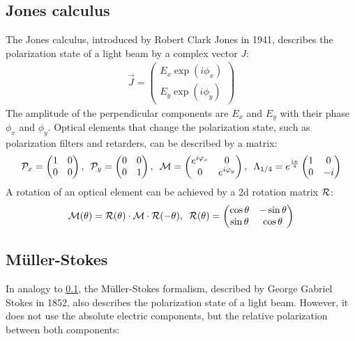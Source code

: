 \subsection{Jones calculus}
\label{sec:jones}
% 
The Jones calculus, introduced by Robert Clark Jones in 1941, describes the polarization state of a light beam by a complex vector $J$:
% 
\begin{align}
    \vec{J} = \begin{pmatrix} E_x \exp(i \phi_x) \\ E_y \exp(i \phi_y) \end{pmatrix}
\end{align}
% 
The amplitude of the perpendicular components are $E_x$ and $E_y$ with their phase $\phi_x$ and $\phi_y$.
Optical elements that change the polarization state, such as polarization filters and retarders, can be described by a matrix:
% 
\begin{align}
\begin{split}
\mathcal{P}_x = 
\begin{pmatrix}
1 & 0 \\ 0 & 0
\end{pmatrix}
, \enspace
\mathcal{P}_y = 
\begin{pmatrix}
0 & 0 \\ 0 & 1
\end{pmatrix}
, \enspace
\mathcal{M} =
\begin{pmatrix}
e^{i \varphi_x} & 0 \\ 0 & e^{i \varphi_y}
\end{pmatrix}
, \enspace
\Lambda_{1/4}=
e^{\frac{i \pi}{4}}
\begin{pmatrix}
1 & 0 \\ 0 & -i
\end{pmatrix}
\end{split}
\end{align}
% 
A rotation of an optical element can be achieved by a 2d rotation matrix $\mathcal{R}$:
% 
\begin{align}
\begin{split}
\mathcal{M}(\theta )=\mathcal{R}(\theta )\cdot\mathcal{M}\cdot\mathcal{R}(-\theta )
, \enspace
\mathcal{R}(\theta ) = 
\begin{pmatrix}
\cos \theta & -\sin \theta \\
\sin \theta & \cos \theta
\end{pmatrix}
\end{split}
\end{align}
% 
% 
% 
\subsection{M\"uller-Stokes}\label{sec:Mueller-Stokes}
\label{sec:mueller_stokes}
% 
In analogy to \cref{sec:jones}, the M\"uller-Stokes formalism, described by George Gabriel Stokes in 1852, also describes the polarization state of a light beam.
However, it does not use the absolute electric components, but the relative polarization between both components:
% 
